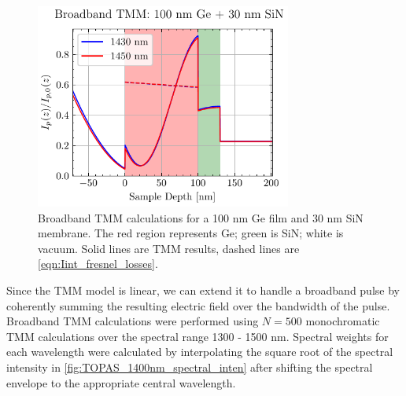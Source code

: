 \begin{figure}
	\centering
	\includegraphics[width=0.75\textwidth]{figures/chap4/TMM_1430_1450_broad_Int.pdf}
	\caption{Broadband TMM calculations for a {100 nm} Ge film and {30 nm} SiN membrane. The red region represents Ge; green is SiN; white is vacuum. Solid lines are TMM results, dashed lines are \cref{eqn:Iint_fresnel_losses}.}
	\label{fig:TMM_1430_1450_broad_Int}
\end{figure}

Since the TMM model is linear, we can extend it to handle a broadband pulse by coherently summing the resulting electric field over the bandwidth of the pulse. Broadband TMM calculations were performed using $N=500$ monochromatic TMM calculations over the spectral range 1300 - 1500 nm. Spectral weights for each wavelength were calculated by interpolating the square root of the spectral intensity in \cref{fig:TOPAS_1400nm_spectral_inten} after shifting the spectral envelope to the appropriate central wavelength.

